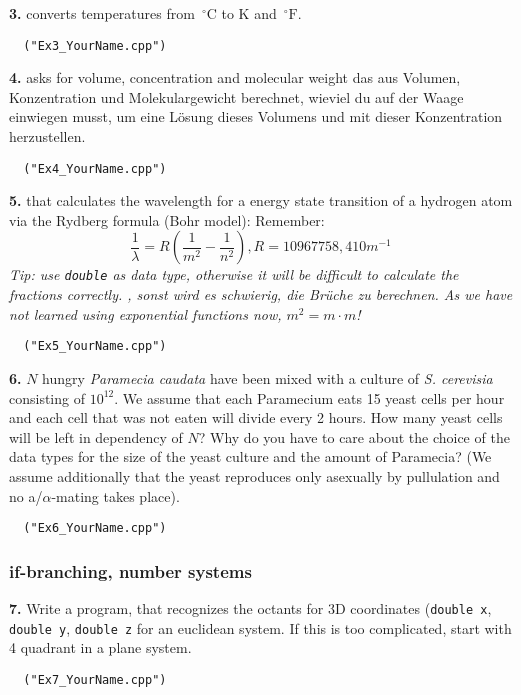 \documentclass[paper=A4, pagesize, DIV=calc, smallheadings,
fontsize=11pt, expansion=false]{scrreprt}
\begin{document}
\textbf{3.}
converts temperatures from  $\,^{\circ}\mathrm{C}$ to K and  $\,^{\circ}\mathrm{F}$.
\begin{verbatim}
  ("Ex3_YourName.cpp")
\end{verbatim}

\textbf{4.} 
 asks for volume, concentration and molecular weight
das aus Volumen, Konzentration und Molekulargewicht berechnet, wieviel du auf der Waage einwiegen musst, um eine Lösung dieses Volumens und mit dieser Konzentration herzustellen.
\begin{verbatim}
  ("Ex4_YourName.cpp")
\end{verbatim}

\textbf{5.} 
that calculates the wavelength for a energy state transition of a hydrogen atom via the Rydberg formula (Bohr model):
Remember:  
  \[\frac{1}{\lambda} = R \left( \frac{1}{m^2} - \frac{1}{n^2}\right), R = 10967758,4 10 m^{-1} \]
\textit{Tip: use \textup{\texttt{double}} as data type, otherwise it will be difficult to calculate the fractions correctly.
, sonst wird es schwierig, die Brüche zu berechnen. As we have not learned using exponential functions now,  $m^2=m \cdot m$!}
\begin{verbatim}
  ("Ex5_YourName.cpp")
\end{verbatim}


\textbf{6.}
 $N$ hungry \emph{Paramecia caudata} have been mixed with a culture of \emph{S. cerevisia} consisting of $10^{12}$.
We assume that each Paramecium eats 15 yeast cells per hour and each cell that was not eaten will divide every 2 hours.
How many yeast cells will be left in dependency of $N$? Why do you have to care about the choice of the data types for the size of 
the yeast culture and the amount of Paramecia?\newline
\small
(We assume additionally that the yeast reproduces only asexually by pullulation and no a/$\alpha$-mating takes place).
\begin{verbatim}
  ("Ex6_YourName.cpp")
\end{verbatim}


\subsubsection*{if-branching, number systems}
\textbf{7.}
Write a program, that recognizes the octants for
 3D coordinates (\texttt{double x}, \texttt{double y}, \texttt{double z} for an euclidean system. 
If this is too complicated, start with 4 quadrant in a plane system.
\begin{verbatim}
  ("Ex7_YourName.cpp")
\end{verbatim}
\end{document}
